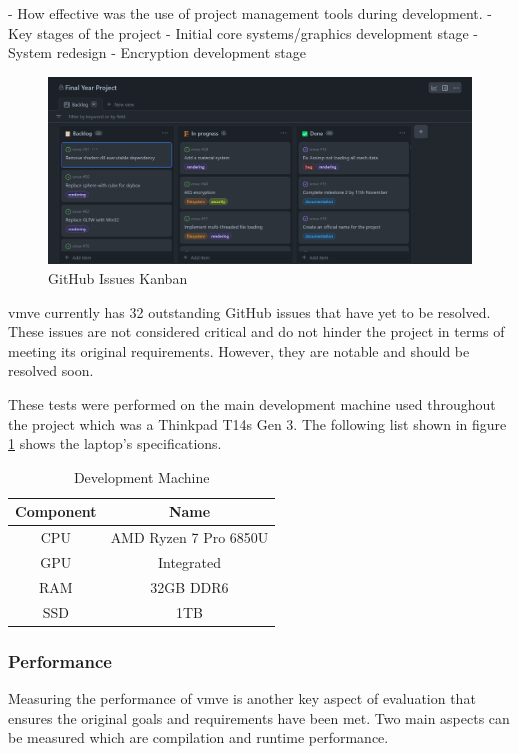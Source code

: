 \documentclass[11pt]{article}
\begin{document}
- How effective was the use of project management tools
during development.
- Key stages of the project
    - Initial core systems/graphics development stage
    - System redesign
    - Encryption development stage

\begin{figure}[H]
  \centering
  \includegraphics[width=\textwidth]{images/github_project.png}
  \caption{GitHub Issues Kanban}
  \label{fig:github_kanban}
\end{figure}
    
\gls*{vmve} currently has 32 outstanding GitHub issues that have yet to be
resolved. These issues are not considered critical and do not hinder the project
in terms of meeting its original requirements. However, they are notable and
should be resolved soon.

These tests were performed on the main development machine used throughout the
project which was a Thinkpad T14s Gen 3. The following list shown in figure
\ref{fig:development_machine} shows the laptop's specifications.

\begin{table}[H]
\centering
\begin{tabular}{|| c c ||} 
  \hline
  Component & Name \\ [0.5ex] 
  \hline\hline
  CPU & AMD Ryzen 7 Pro 6850U  \\ 
  GPU & Integrated \\
  RAM & 32GB DDR6 \\ 
  SSD & 1TB \\
  \hline
\end{tabular}
\caption{Development Machine}
\label{fig:development_machine}
\end{table}


\subsubsection{Performance}
Measuring the performance of \gls*{vmve} is another key aspect of evaluation that
ensures the original goals and requirements have been met. Two main aspects can
be measured which are compilation and runtime performance.
\end{document}
